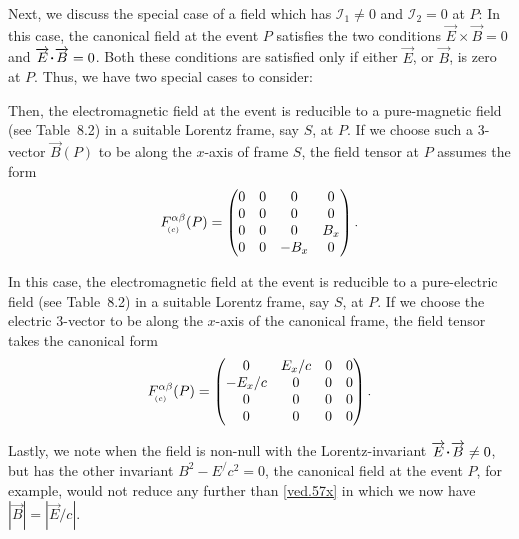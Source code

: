 Next, we discuss the special case of a field which has 
$\mathcal{I}_1\neq 0$ and $\mathcal{I}_2=0$ at $P$: In this 
case, the canonical field at the event $P$ satisfies the 
two 
conditions $ \vec{E}\times \vec{B}=0$ and $\vec{E}\dotp 
\vec{B}=0$.  Both these conditions are satisfied only if 
either $\vec{E}$, or $\vec{B}$, is zero at $P$. Thus, we 
have 
two special cases to consider:

 Then, the electromagnetic field at the 
event is reducible to a pure-magnetic field (see Table~8.2) 
in a suitable Lorentz frame, say $S$, at $P$. If we choose 
such a 3-vector $\vec{B}(P)$ to be along the  $x$-axis of 
frame $S$, the field tensor at $P$ assumes the form
\begin{align}\label{ved.58x}
F^{{\alpha}{\beta}}_{_{\hspace*{-1.5pt}{(c)}}}(P)=
\begin{pmatrix}
0 &  0     &  0      & 0   \\
0 &  0     &  0      & 0   \\
0 &  0     &  0      & B_x\\
0 &  0     &  -B_x & 0
\end{pmatrix}.
\end{align}

In this case, the electromagnetic field 
at 
the event is reducible to a pure-electric field (see 
Table~8.2) in a suitable Lorentz frame, say $S$, at $P$. If 
we choose the electric 3-vector to be along the $x$-axis of 
the canonical frame,  the field tensor takes the canonical 
form
\begin{align}\label{ved.59x}
F^{{\alpha}{\beta}}_{_{\hspace*{-1.5pt}{(c)}}}(P)=
\begin{pmatrix}
0        &  E_x/c  &  0     & 0 \\
-E_x/c &  0        &  0     & 0 \\
0        &  0        &  0     & 0 \\
0        &  0        &  0     & 0
\end{pmatrix}.
\end{align}

Lastly, we note when the field is non-null with the
Lorentz-invariant $\vec{E}\dotp \vec{B}\neq 0$, but has the 
other invariant  $B^2-E^/c^2=0$, the canonical field at the 
event $P$, for  example, would not reduce any further 
than \eqref{ved.57x} in  which we now have $|\vec{B}|= 
|\vec{E}/c|$.

